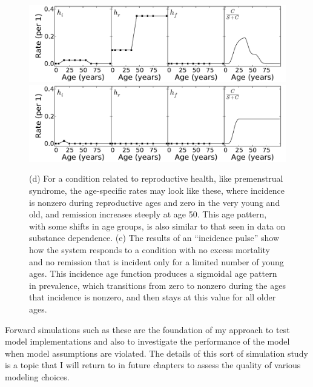 \begin{figure}
\begin{center}
\includegraphics[width=\textwidth]{forward-sim-reproductive.pdf}
\includegraphics[width=\textwidth]{forward-sim-incidence_pulse.pdf}
\caption{(d) For a condition related to reproductive health, like
  premenstrual syndrome, the age-specific rates may look like these,
  where incidence is nonzero during reproductive ages and zero in
  the very young and old, and remission increases steeply at age
  50. This age pattern, with some shifts in age groups, is also similar
  to that seen in data on substance dependence.
(e) The results of an ``incidence pulse'' show how the system
  responds to a condition with no excess mortality and no remission
  that is incident only for a limited number of young ages.  This
  incidence age function produces a sigmoidal age pattern in
  prevalence, which transitions from zero to nonzero during the ages
  that incidence is nonzero, and then stays at this value for all
  older ages.}
\label{forward-sim-ex3b}
\end{center}
\end{figure}


Forward simulations such as these are the foundation of my approach to
test model implementations and also to investigate the performance
of the model when model assumptions are violated. The details of this
sort of simulation study is a topic that I will return to in future chapters to assess the quality of various modeling choices.

